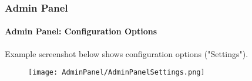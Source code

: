 
\begin{frame}[fragile]
	\frametitle{Admin Panel}
	\framesubtitle{Admin Panel: Configuration Options}

	Example screenshot below shows configuration options ("Settings").

	\begin{figure}
		\texttt{[image: AdminPanel/AdminPanelSettings.png]}
	\end{figure}

\end{frame}

